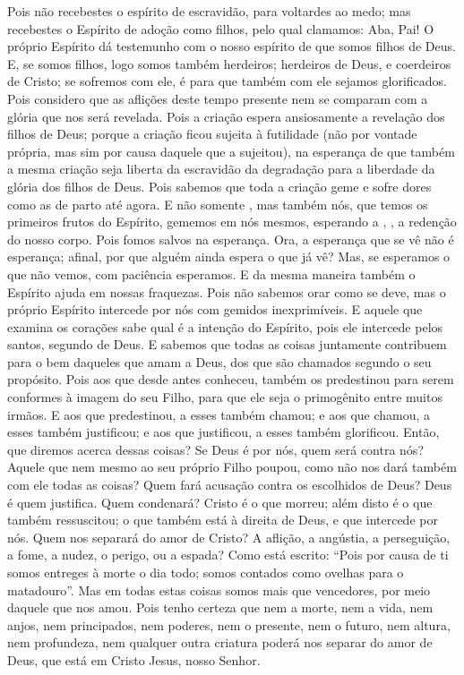 {Pois não recebestes o espírito de escravidão, para voltardes ao medo; mas recebestes o Espírito de adoção como filhos, pelo qual clamamos: Aba, Pai!
O próprio Espírito dá testemunho com
 o nosso espírito de que somos filhos de Deus.
E, se somos filhos, logo somos também herdeiros; herdeiros de Deus, e coerdeiros de Cristo; se sofremos com ele, é para que também com ele sejamos glorificados.
Pois considero que as aflições deste tempo presente nem se comparam com a glória que nos será revelada.
Pois a criação espera ansiosamente
 a revelação dos filhos de Deus;
porque a criação ficou sujeita à futilidade (não por vontade própria, mas sim por causa daquele que a sujeitou),
na esperança de que também a mesma criação seja liberta da escravidão da degradação
 para a liberdade da glória dos filhos de Deus.
Pois sabemos que toda a criação geme e sofre dores como as de parto até agora.
E não somente
{} , mas também nós, que temos os primeiros frutos do Espírito, gememos em nós mesmos, esperando a
{} ,
{} , a redenção do nosso corpo.
Pois fomos salvos na esperança. Ora, a esperança que se vê não é esperança; afinal, por que alguém ainda espera o que já vê?
Mas, se esperamos o que não vemos, com paciência esperamos.
E da mesma maneira também o Espírito ajuda em nossas fraquezas. Pois não sabemos orar como se deve, mas o próprio Espírito intercede por nós com gemidos inexprimíveis.
E aquele que examina os corações sabe qual é a intenção do Espírito, pois ele intercede pelos santos, segundo
{} de Deus.
E sabemos que todas as coisas juntamente contribuem para o bem daqueles que amam a Deus, dos que são chamados segundo o seu propósito.
Pois aos que desde antes conheceu, também os predestinou para serem conformes à imagem do seu Filho, para que ele seja o primogênito entre muitos irmãos.
E aos que predestinou, a esses também chamou; e aos que chamou, a esses também justificou; e aos que justificou, a esses também glorificou.
Então, que diremos acerca dessas coisas? Se Deus é por nós, quem será contra nós?
Aquele que nem mesmo ao seu próprio Filho poupou, como não nos dará também com ele todas as coisas?
Quem fará acusação contra os escolhidos de Deus? Deus é quem justifica.
Quem
{} condenará? Cristo é o que morreu; além disto é o que também ressuscitou; o que também está à direita de Deus, e que intercede por nós.
Quem nos separará do amor de Cristo? A aflição, a angústia, a perseguição, a fome, a nudez, o perigo, ou a espada?
Como está escrito: “Pois por causa de ti somos entreges à morte o dia todo; somos contados como ovelhas para o matadouro”.
{}
Mas em todas estas coisas somos mais que vencedores, por meio daquele que nos amou.
Pois tenho certeza que nem a morte, nem a vida, nem anjos, nem principados, nem poderes, nem o presente, nem o futuro,
nem altura, nem profundeza, nem qualquer outra criatura poderá nos separar do amor de Deus, que está em Cristo Jesus, nosso Senhor.

}
